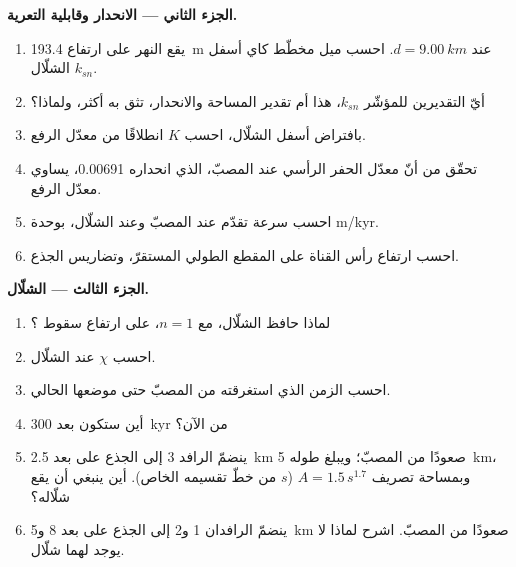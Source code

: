 \begin{problem}
\medskip\noindent\textbf{الجزء الثاني --- الانحدار وقابلية التعرية.}
\begin{enumerate}[resume]
\item يقع النهر على ارتفاع \qty{193.4}{m} عند $d = \qty{9.00}{km}$. احسب
  ميل مخطّط كاي أسفل الشلّال  $k_{sn}$.
\item أيّ التقديرين للمؤشّر $k_{sn}$، هذا أم تقدير المساحة والانحدار،
  تثق به أكثر، ولماذا؟
\item بافتراض  أسفل الشلّال، احسب $K$ انطلاقًا من
  معدّل الرفع.
\item تحقّق من أنّ معدّل الحفر الرأسي عند المصبّ، الذي انحداره
  0.00691، يساوي معدّل الرفع.
\item احسب سرعة تقدّم  عند المصبّ وعند
  الشلّال، بوحدة m/kyr.
\item احسب ارتفاع رأس القناة على المقطع الطولي المستقرّ،
  وتضاريس الجذع.
\end{enumerate}

\medskip\noindent\textbf{الجزء الثالث --- الشلّال.}
\begin{enumerate}[resume]
\item لماذا حافظ الشلّال، مع $n = 1$، على ارتفاع سقوط
  ؟
\item احسب $\chi$ عند الشلّال.
\item احسب الزمن الذي استغرقته  من المصبّ حتى موضعها
  الحالي.
\item أين ستكون بعد \qty{300}{kyr} من الآن؟
\item ينضمّ الرافد 3 إلى الجذع على بعد \qty{2.5}{km} صعودًا من المصبّ؛ ويبلغ
  طوله \qty{5}{km}، وبمساحة تصريف $A = 1.5\,s^{1.7}$ ($s$ من خطّ تقسيمه الخاص).
  أين ينبغي أن يقع شلّاله؟
\item ينضمّ الرافدان 1 و2 إلى الجذع على بعد 8 و\qty{5}{km} صعودًا من
  المصبّ. اشرح لماذا لا يوجد لهما شلّال.
\end{enumerate}


\end{problem}
